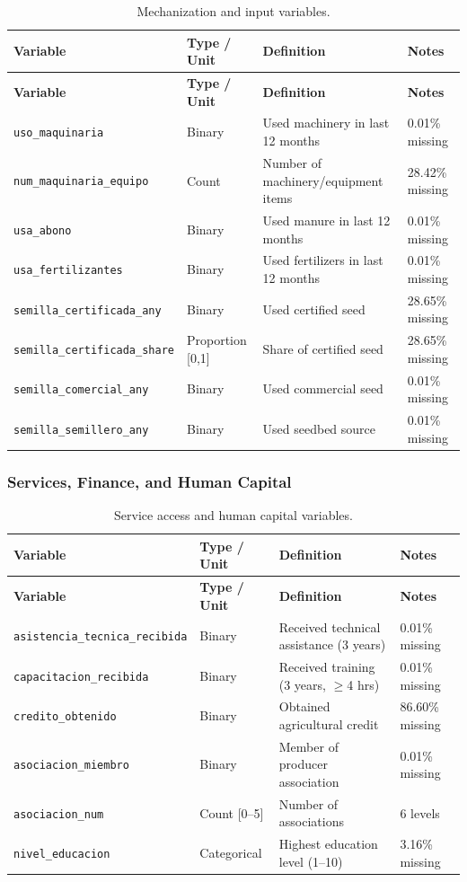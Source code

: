 \documentclass[11pt,a4paper]{article}
\begin{document}
\begin{longtable}{L{3cm}L{2.5cm}L{5cm}L{3.5cm}}
\caption{Mechanization and input variables.} \\
\toprule
\textbf{Variable} & \textbf{Type / Unit} & \textbf{Definition} & \textbf{Notes} \\
\midrule
\endfirsthead
\toprule
\textbf{Variable} & \textbf{Type / Unit} & \textbf{Definition} & \textbf{Notes} \\
\midrule
\endhead
\bottomrule
\endlastfoot
\texttt{uso\_maquinaria} & Binary & Used machinery in last 12 months & 0.01\% missing \\
\texttt{num\_maquinaria\_equipo} & Count & Number of machinery/equipment items & 28.42\% missing \\
\texttt{usa\_abono} & Binary & Used manure in last 12 months & 0.01\% missing \\
\texttt{usa\_fertilizantes} & Binary & Used fertilizers in last 12 months & 0.01\% missing \\
\texttt{semilla\_certificada\_any} & Binary & Used certified seed & 28.65\% missing \\
\texttt{semilla\_certificada\_share} & Proportion [0,1] & Share of certified seed & 28.65\% missing \\
\texttt{semilla\_comercial\_any} & Binary & Used commercial seed & 0.01\% missing \\
\texttt{semilla\_semillero\_any} & Binary & Used seedbed source & 0.01\% missing \\
\end{longtable}

\subsubsection{Services, Finance, and Human Capital}

\begin{longtable}{L{3cm}L{2.5cm}L{5cm}L{3.5cm}}
\caption{Service access and human capital variables.} \\
\toprule
\textbf{Variable} & \textbf{Type / Unit} & \textbf{Definition} & \textbf{Notes} \\
\midrule
\endfirsthead
\toprule
\textbf{Variable} & \textbf{Type / Unit} & \textbf{Definition} & \textbf{Notes} \\
\midrule
\endhead
\bottomrule
\endlastfoot
\texttt{asistencia\_tecnica\_recibida} & Binary & Received technical assistance (3 years) & 0.01\% missing \\
\texttt{capacitacion\_recibida} & Binary & Received training (3 years, $\geq$4 hrs) & 0.01\% missing \\
\texttt{credito\_obtenido} & Binary & Obtained agricultural credit & 86.60\% missing \\
\texttt{asociacion\_miembro} & Binary & Member of producer association & 0.01\% missing \\
\texttt{asociacion\_num} & Count [0--5] & Number of associations & 6 levels \\
\texttt{nivel\_educacion} & Categorical & Highest education level (1--10) & 3.16\% missing \\
\end{longtable}
\end{document}
